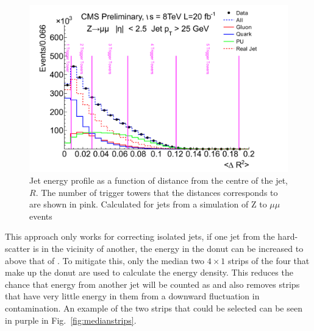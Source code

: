 \begin{figure}
	\begin{center}
		\includegraphics[width=0.8\linewidth]{figs/trigger/jetProfile}
  \caption{ Jet energy profile as a function of distance from the
  centre of the jet, $R$. The number of trigger towers that the
  distances corresponds to are shown in pink. Calculated for jets from
  a simulation of Z to $\mu\mu$ events \cite{JetProfile_pileup}}
	\label{fig:jetprofile}
	\end{center}
\end{figure}

This approach only works for correcting isolated jets, if one jet from
the hard-scatter is
in the vicinity of another, the energy in the donut can be increased to
above that of \PU. To mitigate this, only the median two $4\times1$
\TT strips of the four that make up the donut are used to calculate
the \PU energy density. This reduces the chance that energy from
another jet will be counted as \PU and also removes strips that have
very little energy in them from a downward fluctuation in \PU
contamination. An example of the two strips that could be selected can
be seen in purple in Fig.~\ref{fig:medianstrips}.

